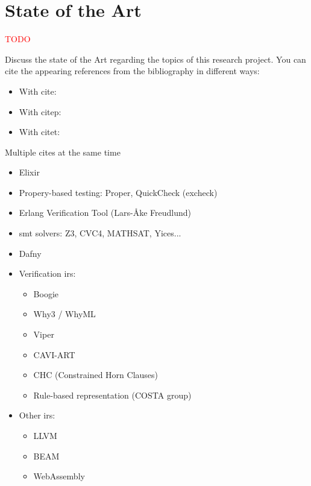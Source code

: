 \chapter{State of the Art}
\label{cap:stateOfTheArt}

\textcolor{red}{TODO}

Discuss the state of the Art regarding the topics of this research project. 
You can cite the appearing references from the bibliography in different ways:

\begin{itemize}
  \item With cite: \cite{programmingElixir}
  \item With citep: \citep{programmingElixir}
  \item With citet: \citet{programmingElixir}
\end{itemize}

Multiple cites at the same time \citep{programmingElixir,masteringElixir,smtLibStandard}

\begin{itemize}
  \item Elixir
  \item Propery-based testing: Proper, QuickCheck (excheck)
  \item Erlang Verification Tool (Lars-Åke Freudlund)
  \item \acrshort{smt} solvers: Z3, CVC4, MATHSAT, Yices...
  \item Dafny
  \item Verification \gls{ir}s:
    \begin{itemize}
      \item Boogie
      \item Why3 / WhyML
      \item Viper
      \item CAVI-ART
      \item CHC (Constrained Horn Clauses)
      \item Rule-based representation (COSTA group)
    \end{itemize}
  \item Other \gls{ir}s:
    \begin{itemize}
      \item LLVM
      \item BEAM
      \item WebAssembly
    \end{itemize}
\end{itemize}

